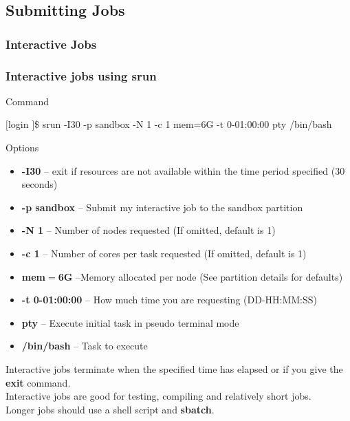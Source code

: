 \subsection {Submitting Jobs}
\subsubsection{Interactive Jobs}
\begin{frame}
  \frametitle{Interactive jobs using srun}

  \begin{block}{Command}\small
		\begin{semiverbatim}$[$login \ctilde$]$\$ srun -I30 -p sandbox -N 1 -c 1 \ddash{}mem=6G -t 0-01:00:00 \ddash{}pty /bin/bash\end{semiverbatim}	
  \end{block}
  \begin{block}{Options}\small
	\begin{itemize}
	\item \textbf{-I30} -- exit if resources are not available within the time period specified (30 seconds)
	\item \textbf{-p sandbox} -- Submit my interactive job to the sandbox partition
	\item \textbf{-N 1} -- Number of nodes requested (If omitted, default is 1)
	\item \textbf{-c 1} -- Number of cores per task requested (If omitted, default is 1)
	\item \textbf{\ddash{}mem$=$6G} --Memory allocated per node (See partition details for defaults)
	\item \textbf{-t 0-01:00:00} -- How much time you are requesting (DD-HH:MM:SS)
	\item \textbf{\ddash{}pty} -- Execute initial task in pseudo terminal mode
	\item \textbf{/bin/bash} -- Task to execute
	\end{itemize}
	\end{block}
  \btVFill
  \begin{center}\small Interactive jobs terminate when the specified time has elapsed or if you give the \textbf{exit} command.\\Interactive jobs are good for testing, compiling and relatively short jobs.\\Longer jobs should use a shell script and \textbf{sbatch}.\\ \end{center}
  \end{frame}



